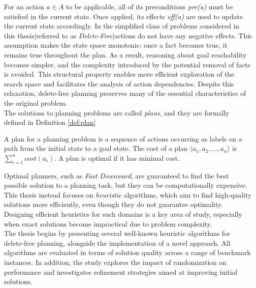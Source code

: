 For an action $a \in A$ to be applicable, all of its preconditions
\textit{pre(a)} must be satisfied in the current state. Once applied, its effects
\textit{eff(a)} are used to update the current state accordingly.
In the simplified class of problems considered in this thesis|referred to as \textit{Delete-Free}|actions do not have any negative effects.
This assumption makes the state space monotonic: once a fact becomes true, it remains true throughout the plan.
As a result, reasoning about goal reachability becomes simpler, and the complexity introduced by the potential removal of facts is avoided.
This structural property enables more efficient exploration of the search space and facilitates the analysis of action dependencies.
Despite this relaxation, delete-free planning preserves many of the essential characteristics of the original problem.\\
The solutions to planning problems are called \textit{plans}, and they are formally defined in Definition \ref{def:plan}

\begin{definition}[Plan]
	\label{def:plan}
	A plan for a planning problem is a sequence of actions occurring as labels on a path
	from the initial state to a goal state.
	The cost of a plan $\langle a_1, a_2, \dots, a_n \rangle$ is $\sum_{i = 1}^n cost(a_i)$.
	A plan is optimal if it has minimal cost.
\end{definition}

Optimal planners, such as \textit{Fast Downward}, are guaranteed to find the best possible solution to a planning task, but they can be
computationally expensive. This thesis instead focuses on \textit{heuristic} algorithms, which aim to find high-quality solutions more efficiently,
even though they do not guarantee optimality.
Designing efficient heuristics for such domains is a key area of study, especially when exact solutions become impractical due to problem complexity.\\
The thesis begins by presenting several well-known heuristic algorithms for delete-free planning, alongside the implementation of a novel approach.
All algorithms are evaluated in terms of solution quality across a range of benchmark instances. In addition, the study explores the impact of
randomization on performance and investigates refinement strategies aimed at improving initial solutions.
